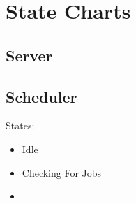 \section{State Charts}

\subsection{Server}

\subsection{Scheduler}


States:
\begin{itemize}
\item Idle
\item Checking For Jobs
\item 
\end{itemize}
